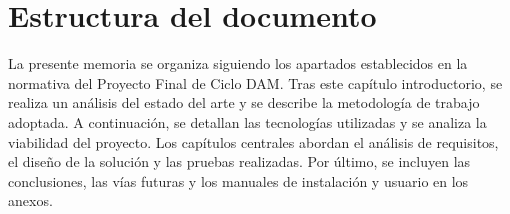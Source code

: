 \section{Estructura del documento}

La presente memoria se organiza siguiendo los apartados establecidos en la normativa del Proyecto Final de Ciclo DAM. Tras este capítulo introductorio, se realiza un análisis del estado del arte y se describe la metodología de trabajo adoptada. A continuación, se detallan las tecnologías utilizadas y se analiza la viabilidad del proyecto. Los capítulos centrales abordan el análisis de requisitos, el diseño de la solución y las pruebas realizadas. Por último, se incluyen las conclusiones, las vías futuras y los manuales de instalación y usuario en los anexos.
